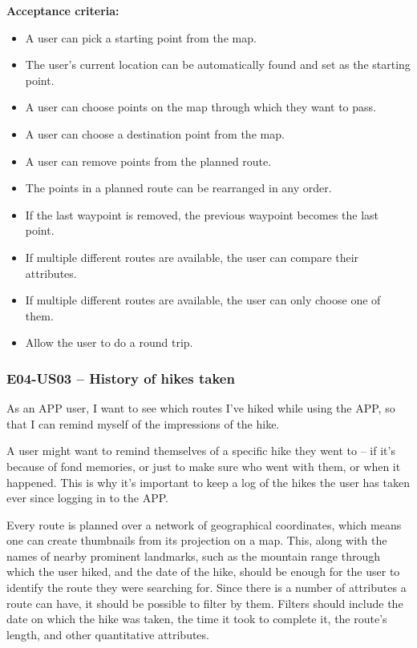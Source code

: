 \textbf{Acceptance criteria:}
\begin{itemize}
    \item A user can pick a starting point from the map.
    \item The user's current location can be automatically found and set as the starting point.
    \item A user can choose points on the map through which they want to pass.
    \item A user can choose a destination point from the map.
    \item A user can remove points from the planned route.
    \item The points in a planned route can be rearranged in any order.
    \item If the last waypoint is removed, the previous waypoint becomes the last point.
    \item If multiple different routes are available, the user can compare their attributes.
    \item If multiple different routes are available, the user can only choose one of them.
    \item Allow the user to do a round trip.
\end{itemize}

\subsubsection*{E04-US03 -- History of hikes taken}
As an APP user, I want to see which routes I've hiked while using the APP, so that I can remind myself of the impressions of the hike.

A user might want to remind themselves of a specific hike they went to -- if it's because of fond memories, or just to make sure who went with them, or when it happened.
This is why it's important to keep a log of the hikes the user has taken ever since logging in to the APP.

Every route is planned over a network of geographical coordinates, which means one can create thumbnails from its projection on a map.
This, along with the names of nearby prominent landmarks, such as the mountain range through which the user hiked, and the date of the hike, should be enough for the user to identify the route they were searching for.
Since there is a number of attributes a route can have, it should be possible to filter by them.
Filters should include the date on which the hike was taken, the time it took to complete it, the route's length, and other quantitative attributes.


